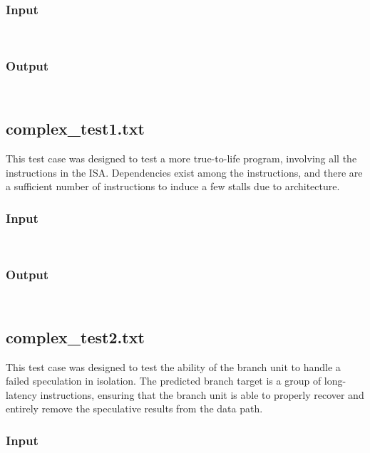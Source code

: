 \documentclass[12pt]{article}
\begin{document}
\subsubsection*{Input}
\begin{verbatim}
    
\end{verbatim}

\subsubsection*{Output}
\begin{verbatim}
    
\end{verbatim}

\subsection{complex\_test1.txt}
This test case was designed to test a more true-to-life program, involving all the instructions in the ISA.  Dependencies exist among the instructions, and there are a sufficient number of instructions to induce a few stalls due to architecture.

\subsubsection*{Input}
\begin{verbatim}
    
\end{verbatim}

\subsubsection*{Output}
\begin{verbatim}
    
\end{verbatim}

\subsection{complex\_test2.txt}
This test case was designed to test the ability of the branch unit to handle a failed speculation in isolation.  The predicted branch target is a group of long-latency instructions, ensuring that the branch unit is able to properly recover and entirely remove the speculative results from the data path.

\subsubsection*{Input}
\begin{verbatim}
    
\end{verbatim}
\end{document}
